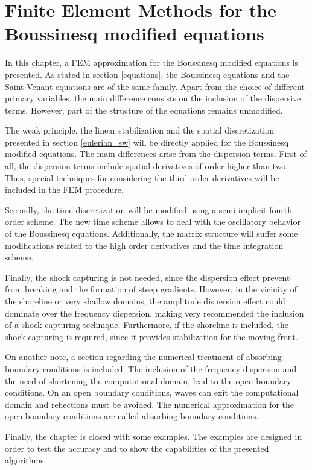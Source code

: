 
\chapter{Finite Element Methods for the Boussinesq modified equations}
\label{eulerian_bsq}


In this chapter, a FEM approximation for the Boussinesq modified equations is presented. As stated in section \ref{equations}, the Boussinesq equations and the Saint Venant equations are of the same family. Apart from the choice of different primary variables, the main difference consists on the inclusion of the dispersive terms. However, part of the structure of the equations remains unmodified.

The weak principle, the linear stabilization and the spatial discretization presented in section \ref{eulerian_sw} will be directly applied for the Boussinesq modified equations. The main differences arise from the dispersion terms.
First of all, the dispersion terms include spatial derivatives of order higher than two. Thus, special techniques for considering the third order derivatives will be included in the FEM procedure.

Secondly, the time discretization will be modified using a semi-implicit fourth-order scheme. The new time scheme allows to deal with the oscillatory behavior of the Boussinesq equations.
Additionally, the matrix structure will suffer some modifications related to the high order derivatives and the time integration scheme.

Finally, the shock capturing is not needed, since the dispersion effect prevent from breaking and the formation of steep gradients. However, in the vicinity of the shoreline or very shallow domains, the amplitude dispersion effect could dominate over the frequency dispersion, making very recommended the inclusion of a shock capturing technique. Furthermore, if the shoreline is included, the shock capturing is required, since it provides stabilization for the moving front.

On another note, a section regarding the numerical treatment of absorbing boundary conditions is included. The inclusion of the frequency dispersion and the need of shortening the computational domain, lead to the open boundary conditions. On an open boundary conditions, waves can exit the computational domain and reflections must be avoided. The numerical approximation for the open boundary conditions are called absorbing boundary conditions.

Finally, the chapter is closed with some examples. The examples are designed in order to test the accuracy and to show the capabilities of the presented algorithms.




